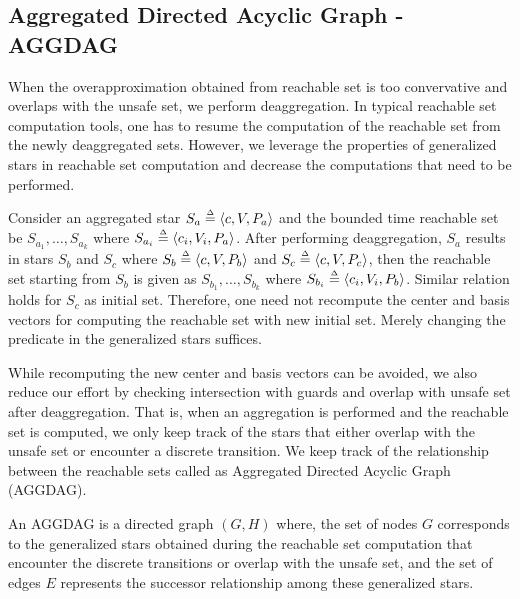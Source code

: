 \vspace{-0.3cm}
\subsection{Aggregated Directed Acyclic Graph - AGGDAG}
\label{sec:aggdag}
\vspace{-0.1cm}

When the overapproximation obtained from reachable set is too convervative and overlaps with the unsafe set, we perform deaggregation. In typical reachable set computation tools, one has to resume the computation of the reachable set from the newly deaggregated sets. However, we leverage the properties of generalized stars in reachable set computation and decrease the computations that need to be performed.

\vspace{-0.1cm}
\begin{remark}
\label{rem:changePred}
Consider an aggregated star $S_a \deq \tup{c, V, P_a}$ and the bounded time reachable set be $S_{a_1}, \ldots, S_{a_k}$ where $S_{a_i} \deq \tup{c_i, V_i, P_a}$. After performing deaggregation, $S_a$ results in stars $S_{b}$ and $S_c$ where $S_{b} \deq \tup{c, V, P_{b}}$ and $S_{c} \deq \tup{c, V, P_{c}}$, then the reachable set starting from $S_{b}$ is given as $S_{b_1}, \ldots, S_{b_k}$ where $S_{b_i} \deq \tup{c_i, V_i, P_b}$. Similar relation holds for $S_{c}$ as initial set. Therefore, one need not recompute the center and basis vectors for computing the reachable set with new initial set. Merely changing the predicate in the generalized stars suffices.
\end{remark}
\vspace{-0.1cm}

While recomputing the new center and basis vectors can be avoided, we also reduce our effort by checking intersection with guards and overlap with unsafe set after deaggregation. That is, when an aggregation is performed and the reachable set is computed, we only keep track of the stars that either overlap with the unsafe set or encounter a discrete transition. We keep track of the relationship between the reachable sets called as Aggregated Directed Acyclic Graph (AGGDAG).

\vspace{-0.1cm}
\begin{definition}
\label{def:aggdag}
An AGGDAG is a directed graph $(G, H)$ where, the set of nodes $G$ corresponds to the generalized stars obtained during the reachable set computation that encounter the discrete transitions or overlap with the unsafe set, and the set of edges $E$ represents the successor relationship among these generalized stars.
\end{definition}
\vspace{-0.4cm}

